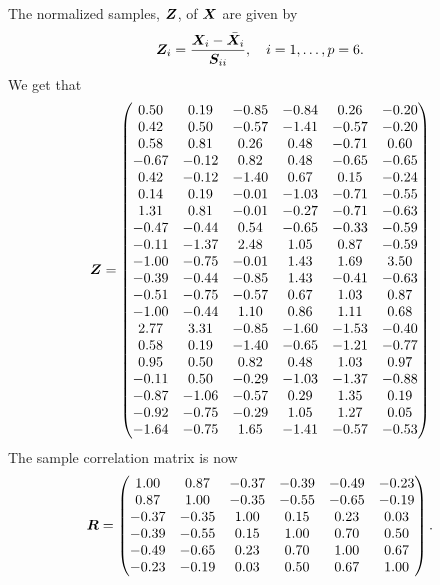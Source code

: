 The normalized samples, $\bm{Z}$, of $\bm{X}$ are given by
\begin{equation*}
  \bm{Z}_i = \frac{\bm{X}_i - \bar {\bm{X}}_i}{\bm{S}_{ii}}, \quad i = 1, \dots, p = 6.
\end{equation*}
We get that
\begin{equation*}
  \bm{Z} =
  \begin{pmatrix}
    0.50 &0.19 &-0.85 &-0.84 &0.26 &-0.20 \\ 
    0.42 &0.50 &-0.57 &-1.41 &-0.57 &-0.20 \\ 
    0.58 &0.81 &0.26 &0.48 &-0.71 &0.60 \\ 
    -0.67 &-0.12 &0.82 &0.48 &-0.65 &-0.65 \\ 
    0.42 &-0.12 &-1.40 &0.67 &0.15 &-0.24 \\ 
    0.14 &0.19 &-0.01 &-1.03 &-0.71 &-0.55 \\ 
    1.31 &0.81 &-0.01 &-0.27 &-0.71 &-0.63 \\ 
    -0.47 &-0.44 &0.54 &-0.65 &-0.33 &-0.59 \\ 
    -0.11 &-1.37 &2.48 &1.05 &0.87 &-0.59 \\ 
    -1.00 &-0.75 &-0.01 &1.43 &1.69 &3.50 \\ 
    -0.39 &-0.44 &-0.85 &1.43 &-0.41 &-0.63 \\ 
    -0.51 &-0.75 &-0.57 &0.67 &1.03 &0.87 \\ 
    -1.00 &-0.44 &1.10 &0.86 &1.11 &0.68 \\ 
    2.77 &3.31 &-0.85 &-1.60 &-1.53 &-0.40 \\ 
    0.58 &0.19 &-1.40 &-0.65 &-1.21 &-0.77 \\ 
    0.95 &0.50 &0.82 &0.48 &1.03 &0.97 \\ 
    -0.11 &0.50 &-0.29 &-1.03 &-1.37 &-0.88 \\ 
    -0.87 &-1.06 &-0.57 &0.29 &1.35 &0.19 \\ 
    -0.92 &-0.75 &-0.29 &1.05 &1.27 &0.05 \\ 
    -1.64 &-0.75 &1.65 &-1.41 &-0.57 &-0.53  
  \end{pmatrix}
\end{equation*}
The sample correlation matrix is now
\begin{equation*}
  \bm{R} =
  \begin{pmatrix}
    1.00 &0.87 &-0.37 &-0.39 &-0.49 &-0.23 \\ 
    0.87 &1.00 &-0.35 &-0.55 &-0.65 &-0.19 \\ 
    -0.37 &-0.35 &1.00 &0.15 &0.23 &0.03 \\ 
    -0.39 &-0.55 &0.15 &1.00 &0.70 &0.50 \\ 
    -0.49 &-0.65 &0.23 &0.70 &1.00 &0.67 \\ 
    -0.23 &-0.19 &0.03 &0.50 &0.67 &1.00
  \end{pmatrix}.
\end{equation*}
